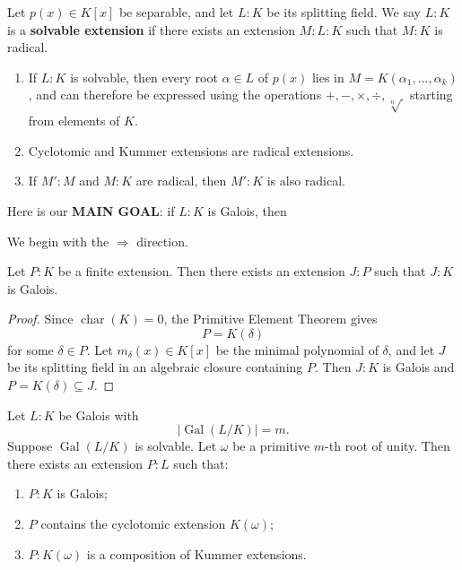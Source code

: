 \begin{definition}\label{def-solvext}
    Let $p(x)\in K[x]$ be separable, and let $L:K$ be its splitting field.
    We say $L:K$ is a {\bf solvable extension} if there exists an extension
    $M:L:K$ such that $M:K$ is radical.
\end{definition}

\begin{remark}\label{rmk-radical}
    \begin{enumerate}
        \item If $L:K$ is solvable, then every root $\alpha\in L$ of $p(x)$ lies in
        $M=K(\alpha_1,\dots,\alpha_k)$, and can therefore be expressed using the operations
        $+,-,\times,\div,\sqrt[n]{\,}$ starting from elements of $K$.
        \item Cyclotomic and Kummer extensions are radical extensions.
        \item If $M':M$ and $M:K$ are radical, then $M':K$ is also radical.
    \end{enumerate}
\end{remark}

Here is our {\bf MAIN GOAL}: if $L:K$ is Galois, then
\begin{center}
\end{center}

We begin with the $\Rightarrow$ direction.

\begin{lemma}\label{lem-galclosure}
    Let $P:K$ be a finite extension. Then there exists an extension $J:P$ such that $J:K$ is Galois.
\end{lemma}

\begin{proof}
    Since $\operatorname{char}(K)=0$, the Primitive Element Theorem gives
    \[
    P=K(\delta)
    \]
    for some $\delta\in P$. Let $m_\delta(x)\in K[x]$ be the minimal polynomial of $\delta$, and let $J$ be its splitting field in an algebraic closure containing $P$.
    Then $J:K$ is Galois and $P=K(\delta)\subseteq J$.
\end{proof}

\begin{theorem}\label{thm-radleft}
    Let $L:K$ be Galois with
    \[
    |\operatorname{Gal}(L/K)|=m.
    \]
    Suppose $\operatorname{Gal}(L/K)$ is solvable. Let $\omega$ be a primitive $m$-th root of unity. Then there exists an extension $P:L$ such that:
    \begin{enumerate}
        \item $P:K$ is Galois;
        \item $P$ contains the cyclotomic extension $K(\omega)$;
        \item $P:K(\omega)$ is a composition of Kummer extensions.
    \end{enumerate}
\end{theorem}

